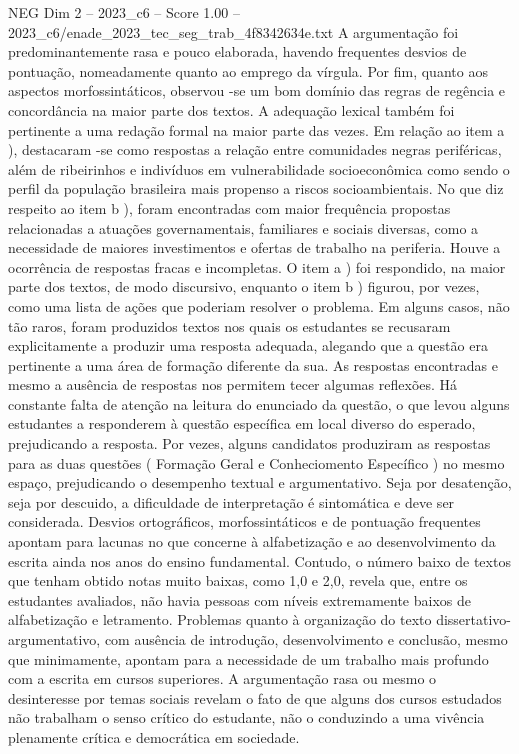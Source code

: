 \begin{textsample}{NEG Dim 2 – 2023\_c6 – Score 1.00 – 2023\_c6/enade\_2023\_tec\_seg\_trab\_4f8342634e.txt}
A argumentação foi predominantemente rasa e pouco elaborada, havendo frequentes desvios de pontuação, nomeadamente quanto ao emprego da vírgula.
Por fim, quanto aos aspectos morfossintáticos, observou -se um bom domínio das regras de regência e concordância na maior parte dos textos.
A adequação lexical também foi pertinente a uma redação formal na maior parte das vezes.
Em relação ao item a ), destacaram -se como respostas a relação entre comunidades negras periféricas, além de ribeirinhos e indivíduos em vulnerabilidade socioeconômica como sendo o perfil da população brasileira mais propenso a riscos socioambientais.
No que diz respeito ao item b ), foram encontradas com maior frequência propostas relacionadas a atuações governamentais, familiares e sociais diversas, como a necessidade de maiores investimentos e ofertas de trabalho na periferia.
Houve a ocorrência de respostas fracas e incompletas.
O item a ) foi respondido, na maior parte dos textos, de modo discursivo, enquanto o item b ) figurou, por vezes, como uma lista de ações que poderiam resolver o problema.
Em alguns casos, não tão raros, foram produzidos textos nos quais os estudantes se recusaram explicitamente a produzir uma resposta adequada, alegando que a questão era pertinente a uma área de formação diferente da sua.
As respostas encontradas e mesmo a ausência de respostas nos permitem tecer algumas reflexões.
Há constante falta de atenção na leitura do enunciado da questão, o que levou alguns estudantes a responderem à questão específica em local diverso do esperado, prejudicando a resposta.
Por vezes, alguns candidatos produziram as respostas para as duas questões ( Formação Geral e Conheciomento Específico ) no mesmo espaço, prejudicando o desempenho textual e argumentativo.
Seja por desatenção, seja por descuido, a dificuldade de interpretação é sintomática e deve ser considerada.
Desvios ortográficos, morfossintáticos e de pontuação frequentes apontam para lacunas no que concerne à alfabetização e ao desenvolvimento da escrita ainda nos anos do ensino fundamental.
Contudo, o número baixo de textos que tenham obtido notas muito baixas, como 1,0 e 2,0, revela que, entre os estudantes avaliados, não havia pessoas com níveis extremamente baixos de alfabetização e letramento.
Problemas quanto à organização do texto dissertativo-argumentativo, com ausência de introdução, desenvolvimento e conclusão, mesmo que minimamente, apontam para a necessidade de um trabalho mais profundo com a escrita em cursos superiores.
A argumentação rasa ou mesmo o desinteresse por temas sociais revelam o fato de que alguns dos cursos estudados não trabalham o senso crítico do estudante, não o conduzindo a uma vivência plenamente crítica e democrática em sociedade.

\end{textsample}
